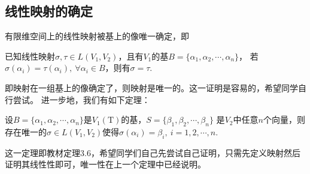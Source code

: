 \subsection{线性映射的确定}
有限维空间上的线性映射被基上的像唯一确定，即
\begin{theorem}
	已知线性映射$\sigma,\tau\in L(V_1,V_2)$，且有$V_1$的基$B=\{\alpha_1,\alpha_2,\cdots,\alpha_n\}$，
	若$\sigma(\alpha_i)=\tau(\alpha_i),\ \forall \alpha_i \in B$，则有$\sigma=\tau$.
\end{theorem}
即映射在一组基上的像确定了，则映射是唯一的。这一证明是容易的，希望同学自行尝试。
进一步地，我们有如下定理：
\begin{theorem}
	设$B=\{\alpha_1,\alpha_2,\cdots,\alpha_n\}$是$V_1(\mathrm{T})$的基，$S=\{\beta_1,\beta_2,\cdots,\beta_n\}$
	是$V_2$中任意$n$个向量，则存在唯一的$\sigma\in L(V_1,V_2)$使得$\sigma(\alpha_i)=\beta_i,\ i=1,2,\cdots,n$.
\end{theorem}
这一定理即教材定理3.6，希望同学们自己先尝试自己证明，只需先定义映射然后证明其线性性即可，唯一性在上一个定理中已经说明。
